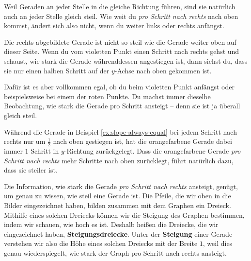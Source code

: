 \documentclass[../../main.tex]{subfiles}
\begin{document}
Weil Geraden an jeder Stelle in die gleiche Richtung führen, sind sie natürlich auch an jeder Stelle gleich steil. Wie weit du \emph{pro Schritt nach rechts} nach oben kommst, ändert sich also nicht, wenn du weiter links oder rechts anfängst.

\begin{example}{}
    Die rechts abgebildete Gerade ist nicht so steil wie die Gerade weiter oben auf dieser Seite. Wenn du vom violetten Punkt einen Schritt nach rechts gehst und schaust, wie stark die Gerade währenddessen angestiegen ist, dann siehst du, dass sie nur einen halben Schritt auf der $y$-Achse nach oben gekommen ist.
    
    Dafür ist es aber vollkommen egal, ob du beim violetten Punkt anfängst oder beispielsweise bei einem der roten Punkte. Du machst immer dieselbe Beobachtung, wie stark die Gerade pro Schritt ansteigt -- denn sie ist ja überall gleich steil.
\end{example}

Während die Gerade in Beispiel \ref{ex:slope-always-equal} bei jedem Schritt nach rechts nur um $\frac{1}{2}$ nach oben gestiegen ist, hat die orangefarbene Gerade dabei immer $1$ Schritt in $y$-Richtung zurückgelegt. Dass die orangefarbene Gerade \emph{pro Schritt nach rechts} mehr Schritte nach oben zurücklegt, führt natürlich dazu, dass sie steiler ist.

Die Information, wie stark die Gerade \emph{pro Schritt nach rechts} ansteigt, genügt, um genau zu wissen, wie steil eine Gerade ist. Die Pfeile, die wir oben in die Bilder eingezeichnet haben, bilden zusammen mit dem Graphen ein Dreieck. Mithilfe eines solchen Dreiecks können wir die Steigung des Graphen bestimmen, indem wir schauen, wie hoch es ist. Deshalb heißen die Dreiecke, die wir eingezeichnet haben, \textbf{Steigungsdreiecke}. Unter der \textbf{Steigung} einer Gerade verstehen wir also die Höhe eines solchen Dreiecks mit der Breite $1$, weil dies genau wiederspiegelt, wie stark der Graph pro Schritt nach rechts ansteigt.
\end{document}
